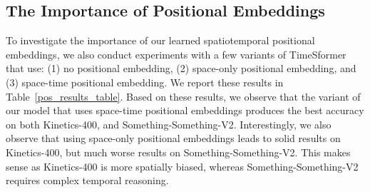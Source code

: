 \documentclass{article}
\begin{document}






\subsection{The Importance of Positional Embeddings} 



To investigate the importance of our learned spatiotemporal positional embeddings, we also conduct experiments with a few variants of TimeSformer that use: (1) no positional embedding, (2) space-only positional embedding, and (3) space-time positional embedding. We report these results in Table~\ref{pos_results_table}. Based on these results, we observe that the variant of our model that uses space-time positional embeddings produces the best accuracy on both Kinetics-400, and Something-Something-V2. Interestingly, we also observe that using space-only positional embeddings leads to solid results on Kinetics-400, but much worse results on Something-Something-V2. This makes sense as Kinetics-400 is more spatially biased, whereas Something-Something-V2 requires complex temporal reasoning.
\end{document}
